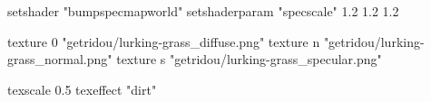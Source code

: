 setshader "bumpspecmapworld"
setshaderparam "specscale" 1.2 1.2 1.2

   texture 0 "getridou/lurking-grass_diffuse.png"
   texture n "getridou/lurking-grass_normal.png"
   texture s "getridou/lurking-grass_specular.png"

texscale 0.5
texeffect "dirt"
